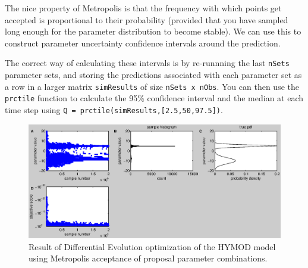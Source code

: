 
The nice property of Metropolis is that the frequency with which points get
accepted is proportional to their probability (provided that you have sampled
long enough for the parameter distribution to become stable). We can use this to
construct parameter uncertainty confidence intervals around the prediction.

The correct way of calculating these intervals is by re-runnning the last
\texttt{nSets} parameter sets, and storing the predictions associated with each
parameter set as a row in a larger matrix \texttt{simResults} of size
\texttt{nSets x nObs}. You can then use the \texttt{prctile} function to
calculate the 95\% confidence interval and the median at each time step using
\texttt{Q = prctile(simResults,[2.5,50,97.5])}.


\begin{figure}[htbp]
  \centering
    \includegraphics[width=1.0\textwidth]{./../eps/diffevo-metro-result.eps}
  \caption{Result of Differential Evolution optimization of the HYMOD model
  using Metropolis acceptance of proposal parameter combinations.}
  \label{fig:diffevo-metro-result}
\end{figure}




